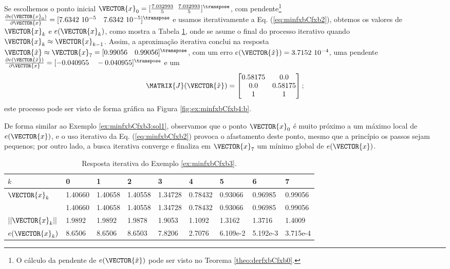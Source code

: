 \begin{SolutionT}
\label{ex:minfxbCfxb3:sol2}
Se escolhemos o ponto inicial $\VECTOR{x}_0=[\frac{7.032993}{5}$ $\frac{7.032993}{5}]^{\transpose}$,
com pendente\footnote{O cálculo da
pendente de $e(\VECTOR{\hat{x}})$ pode ser visto no Teorema \ref{theo:derfxbCfxb0}.} 
$\frac{\partial e(\VECTOR{x}_0)}{\partial \VECTOR{x} }=[7.6342~10^{-5}\quad 7.6342~10^{-5}]^{\transpose}$ e 
usamos iterativamente a Eq. (\ref{eq:minfxbCfxb2}), obtemos os valores 
de $\VECTOR{x}_k$ e $e(\VECTOR{x}_k)$, como mostra a Tabela \ref{table:ex:minfxbCfxb4},
onde se asume o final do processo iterativo quando $\VECTOR{x}_k \approx \VECTOR{x}_{k-1}$.
Assim, a aproximação iterativa conclui na resposta $\VECTOR{\hat{x}}\approx \VECTOR{x}_{7} =[0.99056\quad 0.99056]^{\transpose}$,
com um erro $e(\VECTOR{\hat{x}})=3.7152~10^{-4}$, uma pendente
$\frac{\partial e(\VECTOR{\hat{x}})}{\partial \VECTOR{x} }=[-0.040955\quad -0.040955]^{\transpose}$
e um
\begin{equation}
\MATRIX{J}(\VECTOR{\hat{x}})=
\begin{bmatrix}
0.58175 & 0.0\\ 
0.0     & 0.58175\\
1       & 1
\end{bmatrix};
\end{equation}
este processo pode ser visto de forma gráfica na Figura \ref{fig:ex:minfxbCfxb4:b}.

De forma similar ao Exemplo \ref{ex:minfxbCfxb3:sol1}, observamos 
que o ponto $\VECTOR{x}_0$ é muito próximo a um máximo local de 
$e(\VECTOR{x})$, e o uso iterativo da Eq. (\ref{eq:minfxbCfxb2}) 
provoca o afastamento deste ponto, mesmo que a princípio os passos sejam pequenos;
por outro lado, a busca iterativa converge e finaliza em $\VECTOR{x}_7$ um mínimo global
de $e(\VECTOR{x})$.
\end{SolutionT}


\begin{table}[h!]
\centering
\begin{tabular}{|l|l|l|l|l|l|l|l|l|}
\hline
$k$ & 0 & 1 & 2 & 3 & 4 & 5 & 6 & 7\\ \hline
$\VECTOR{x}_k$ & 1.40660   & 1.40658   & 1.40558   & 1.34728   & 0.78432   & 0.93066   & 0.96985   & 0.99056 \\ 
~              & 1.40660   & 1.40658   & 1.40558   & 1.34728   & 0.78432   & 0.93066   & 0.96985   & 0.99056 \\ \hline
$||\VECTOR{x}_k||$ & 1.9892   & 1.9892   & 1.9878   & 1.9053   & 1.1092   & 1.3162   & 1.3716   & 1.4009 \\ \hline
$e(\VECTOR{x}_k)$ & 8.6506  & 8.6506  & 8.6503  & 7.8206  & 2.7076  & 6.109e-2 &  5.192e-3  & 3.715e-4 \\ \hline
\end{tabular}
\caption{Resposta iterativa do Exemplo \ref{ex:minfxbCfxb3}.}
\label{table:ex:minfxbCfxb4}
\end{table}

